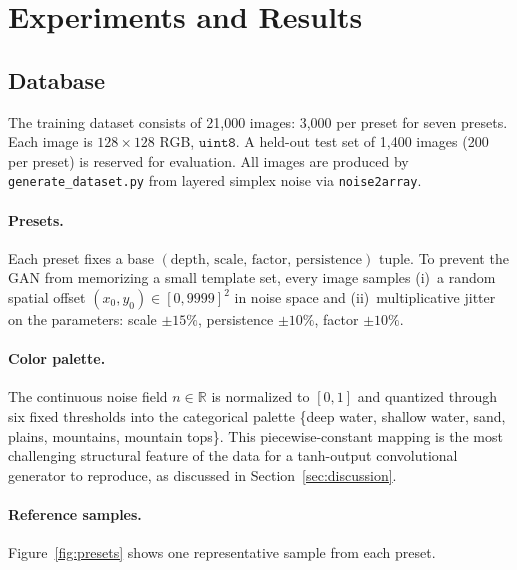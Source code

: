 \documentclass[11pt]{article}
\begin{document}
\section{Experiments and Results}

\subsection{Database}
The training dataset consists of 21{,}000 images: 3{,}000 per preset for seven
presets. Each image is $128{\times}128$ RGB, $\mathtt{uint8}$. A held-out test
set of 1{,}400 images (200 per preset) is reserved for evaluation. All images
are produced by \texttt{generate\_dataset.py} from layered simplex noise via
\texttt{noise2array}.

\paragraph{Presets.}
Each preset fixes a base $(\text{depth},\,\text{scale},\,\text{factor},\,
\text{persistence})$ tuple. To prevent the GAN from memorizing a small
template set, every image samples (i)~a random spatial offset
$(x_0,y_0) \in [0,9999]^2$ in noise space and (ii)~multiplicative jitter on
the parameters: scale $\pm 15\%$, persistence $\pm 10\%$, factor $\pm 10\%$.

\paragraph{Color palette.}
The continuous noise field $n \in \mathbb{R}$ is normalized to $[0,1]$ and
quantized through six fixed thresholds into the categorical palette
\{deep water, shallow water, sand, plains, mountains, mountain tops\}.
This piecewise-constant mapping is the most challenging structural feature
of the data for a tanh-output convolutional generator to reproduce, as
discussed in Section~\ref{sec:discussion}.

\paragraph{Reference samples.}
Figure~\ref{fig:presets} shows one representative sample from each preset.
\end{document}
